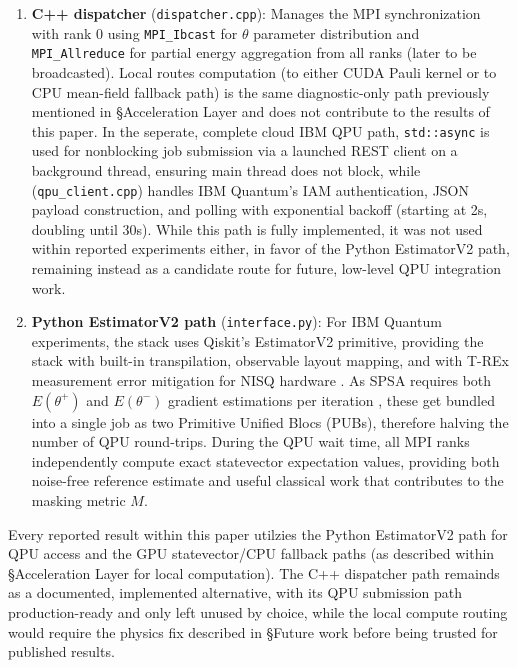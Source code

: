 \begin{enumerate}
    \item \textbf{C++ dispatcher} (\texttt{dispatcher.cpp}): Manages the MPI synchronization with rank 0 using \texttt{MPI\_Ibcast} for $\theta$  parameter distribution and \texttt{MPI\_Allreduce} for partial energy aggregation from all ranks (later to be broadcasted). Local routes computation (to either CUDA Pauli kernel or to CPU mean-field fallback path) is the same diagnostic-only path previously mentioned in \S Acceleration Layer and does not contribute to the results of this paper. In the seperate, complete cloud IBM QPU path, \texttt{std::async} is used for nonblocking job submission via a launched REST client on a background thread, ensuring main thread does not block, while (\texttt{qpu\_client.cpp}) handles IBM Quantum's IAM authentication, JSON payload construction, and polling with exponential backoff (starting at 2s, doubling until 30s). While this path is fully implemented, it was not used within reported experiments either, in favor of the Python EstimatorV2 path, remaining instead as a candidate route for future, low-level QPU integration work. 
    \item \textbf{Python EstimatorV2 path} (\texttt{interface.py}): For IBM Quantum experiments, the stack uses Qiskit's EstimatorV2 primitive, providing the stack with built-in transpilation, observable layout mapping, and with T-REx measurement error mitigation for NISQ hardware \parencite{cai2023quantumerrormitigation}. As SPSA requires both $E(\theta^+)$ and $E(\theta^-)$ gradient estimations per iteration \parencite{pellow2021classicoptimizers}, these get bundled into a single job as two Primitive Unified Blocs (PUBs), therefore halving the number of QPU round-trips. During the QPU wait time, all MPI ranks independently compute exact statevector expectation values, providing both noise-free reference estimate and useful classical work that contributes to the masking metric $M$.
\end{enumerate}

Every reported result within this paper utilzies the Python EstimatorV2 path for QPU access and the GPU statevector/CPU fallback paths
(as described within \S Acceleration Layer for local computation). The C++ dispatcher path remainds as a documented, implemented alternative, 
with its QPU submission path production-ready and only left unused by choice, while the local compute routing would require the physics fix described 
in \S Future work before being trusted for published results. 

